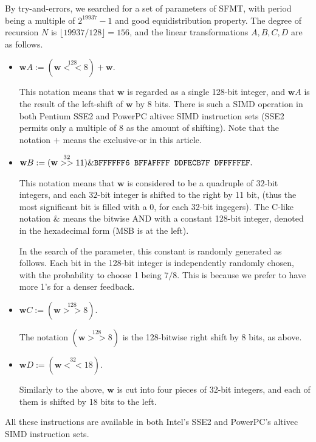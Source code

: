 \documentclass[acmnow]{acmtrans2m}
\def\bw{{{\mathbf w}}}
\begin{document}
By try-and-errors, 
we searched for a set of parameters of SFMT,
with period being a multiple of $2^{19937}-1$
and good equidistribution property.
The degree of recursion $N$ is $\lfloor 19937/128 \rfloor=156$, 
and the linear transformations $A,B,C,D$ are as follows.
\begin{itemize}
\item 
$\bw A := (\bw \stackrel{128}{<<} 8) + \bw.$

This notation means that $\bw$ is regarded
as a single 128-bit integer, and 
$\bw A$ is the result of the left-shift
of $\bw$ by 8 bits. There is such a SIMD operation
in both Pentium SSE2 and PowerPC altivec SIMD instruction 
sets (SSE2 permits only a multiple of 8
as the amount of shifting). 
Note that the notation $+$ means the exclusive-or
in this article.

\item
$\bw B := (\bw \stackrel{32}{>>} 11) \& \mbox{\tt BFFFFFF6 BFFAFFFF DDFECB7F DFFFFFEF}.$

This notation means that $\bw$ is considered to be 
a quadruple of $32$-bit integers, and
each $32$-bit integer is shifted to the right by 11 bit,
(thus the most significant bit is filled with a 0, 
for each 32-bit ingegers).
The C-like notation $\&$ means the bitwise AND
with a constant 128-bit integer,
denoted in the hexadecimal form
(MSB is at the left). 

In the search of the parameter, 
this constant is randomly generated as follows. 
Each bit in the 128-bit integer is independently 
randomly chosen, with the probability to choose 1 being $7/8$.
This is because we prefer to have more 1's for a denser 
feedback.

\item 
$\bw C := (\bw \stackrel{128}{>>} 8).$

The notation 
$(\bw \stackrel{128}{>>} 8)$ is the 128-bitwise right shift 
by 8 bits, as above.

\item
$\bw D := (\bw \stackrel{32}{<<} 18).$

Similarly to the above,
$\bw$ is cut into four pieces of 32-bit integers,
and each of them is shifted by 18 bits to the left.
\end{itemize}
All these instructions are available in 
both Intel's SSE2 and PowerPC's altivec SIMD instruction sets.
\end{document}
